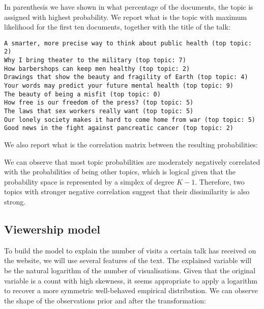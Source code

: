 \documentclass[a4paper, 11pt]{article} %
\begin{document}
In parenthesis we have shown in what percentage of the documents, the topic is assigned with highest probability. We report what is the topic with maximum likelihood for the first ten documents, together with the title of the talk:

\begin{small}
\begin{verbatim}
A smarter, more precise way to think about public health (top topic: 2)
Why I bring theater to the military (top topic: 7)
How barbershops can keep men healthy (top topic: 2)
Drawings that show the beauty and fragility of Earth (top topic: 4)
Your words may predict your future mental health (top topic: 9)
The beauty of being a misfit (top topic: 0)
How free is our freedom of the press? (top topic: 5)
The laws that sex workers really want (top topic: 5)
Our lonely society makes it hard to come home from war (top topic: 5)
Good news in the fight against pancreatic cancer (top topic: 2)
\end{verbatim}
\end{small}

We also report what is the correlation matrix between the resulting probabilities:

\begin{center}

\end{center}

We can observe that most topic probabilities are moderately negatively correlated with the probabilities of being other topics, which is logical given that the probability space is represented by a simplex of degree $K-1$. Therefore, two topics with stronger negative correlation suggest that their dissimilarity is also strong.

\subsection*{Viewership model}

To build the model to explain the number of visits a certain talk has received on the website, we will use several features of the text. The explained variable will be the natural logarithm of the number of visualisations. Given that the original variable is a count with high skewness, it seems appropriate to apply a logarithm to recover a more symmetric well-behaved empirical distribution. We can observe the shape of the observations prior and after the transformation:

\begin{center}

\end{center}
\end{document}
